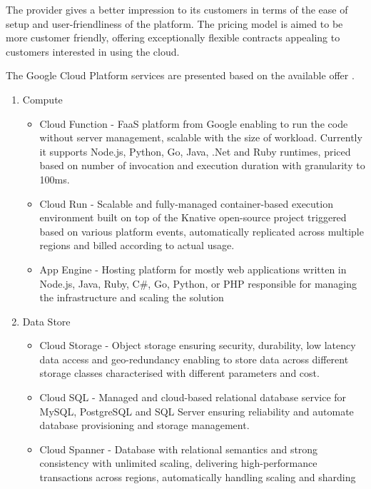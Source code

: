 The provider gives a better impression to its customers in terms of the ease of setup and user-friendliness of the platform. The pricing model is aimed to be more customer friendly, offering exceptionally flexible contracts appealing to customers interested in using the cloud.

The Google Cloud Platform services are presented based on the available offer \cite{GCPServerlessOffering}.


\begin{enumerate}
   \item Compute
   \begin{itemize}
       \item Cloud Function - FaaS platform from Google enabling to run the code without server management, scalable with the size of workload. Currently it supports Node.js, Python, Go, Java, .Net and Ruby runtimes, priced based on number of invocation and execution duration with granularity to 100ms.
       \item Cloud Run - Scalable and fully-managed container-based execution environment built on top of the Knative open-source project triggered based on various platform events, automatically replicated across multiple regions and billed according to actual usage.
       \item App Engine - Hosting platform for mostly web applications written in Node.js, Java, Ruby, C\#, Go, Python, or PHP responsible for managing the infrastructure and scaling the solution
   \end{itemize}
   \item Data Store
   \begin{itemize}
       \item Cloud Storage - Object storage ensuring security, durability, low latency data access and geo-redundancy enabling to store data across different storage classes characterised with different parameters and cost.
       \item Cloud SQL - Managed and cloud-based relational database service for MySQL, PostgreSQL and SQL Server ensuring reliability and automate database provisioning and storage management.
       \item Cloud Spanner - Database with relational semantics and strong consistency with unlimited scaling, delivering high-performance transactions across regions, automatically handling scaling and sharding

\end{itemize}
\end{enumerate}
